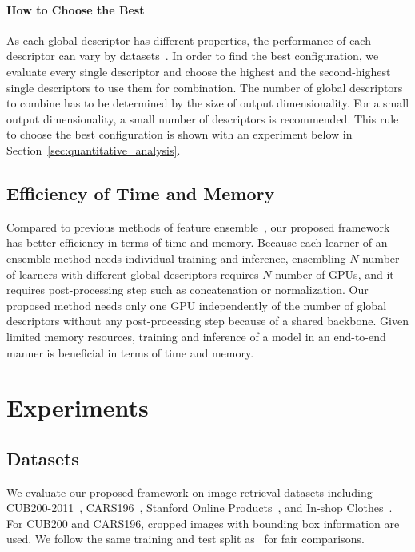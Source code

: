 \documentclass[10pt,twocolumn,letterpaper]{article}
\begin{document}
\begin{CJK}{UTF8}{mj}
\vspace{-4mm}
\paragraph{How to Choose the Best}
As each global descriptor has different properties, the performance of each descriptor can vary by datasets~\cite{boureau2010theoretical}.
In order to find the best configuration, we evaluate every single descriptor and choose the highest and the second-highest single descriptors to use them for combination.
The number of global descriptors to combine has to be determined by the size of output dimensionality.
For a small output dimensionality, a small number of descriptors is recommended.
This rule to choose the best configuration is shown with an experiment below in Section~\ref{sec:quantitative_analysis}.


\subsection{Efficiency of Time and Memory}
Compared to previous methods of feature ensemble~\cite{ozaki2019large, chen20192nd, lin2018regional}, our proposed framework has better efficiency in terms of time and memory.
Because each learner of an ensemble method needs individual training and inference, ensembling $N$ number of learners with different global descriptors requires $N$ number of GPUs, and it requires post-processing step such as concatenation or normalization.
Our proposed method needs only one GPU independently of the number of global descriptors without any post-processing step because of a shared backbone.
Given limited memory resources, training and inference of a model in an end-to-end manner is beneficial in terms of time and memory.


\section{Experiments}


\subsection{Datasets}

We evaluate our proposed framework on image retrieval datasets including CUB200-2011~\cite{wah2011caltech}, CARS196~\cite{krause20133d}, Stanford Online Products~\cite{oh2016deep}, and In-shop Clothes~\cite{liu2016deepfashion}.
For CUB200 and CARS196, cropped images with bounding box information are used.
We follow the same training and test split as~\cite{dai2018batch, Kim_2018_ECCV, zhai2018making} for fair comparisons.


\end{CJK}
\end{document}
